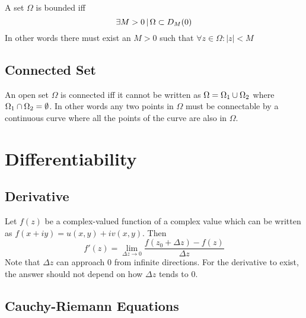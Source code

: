 \documentclass{article}
\begin{document}
A set \(\Omega\) is bounded iff
\[
    \exists M>0 \,|\, \Omega \subset D_M(0)
\]
In other words there must exist an \(M>0\) such that \(\forall z\in \Omega:|z|<M\)

\subsection{Connected Set}

An open set \(\Omega\) is connected iff it cannot be written as
\(\Omega=\Omega_1 \cup \Omega_2\) where \(\Omega_1 \cap \Omega_2 = \emptyset\).
In other words any two points in \(\Omega\) must be connectable by a continuous
curve where all the points of the curve are also in \(\Omega\).


\pagebreak

\section{Differentiability}

\subsection{Derivative}

Let \(f(z)\) be a complex-valued function
of a complex value which can be written as
\(f(x+iy)=u(x,y)+iv(x,y)\). Then
\[
    f'(z) = \lim_{\Delta z \to 0} \frac{f(z_0 + \Delta z)-f(z)}{\Delta z}
\]
Note that \(\Delta z\) can approach \(0\) from
infinite directions.
For the derivative to exist, the answer
should not depend on how \(\Delta z\) tends to 0.

\subsection{Cauchy-Riemann Equations}
\end{document}
